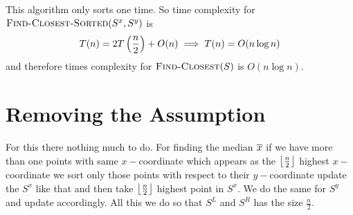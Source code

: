 This algorithm only sorts one time. So time complexity for $\textsc{Find-Closest-Sorted}(S^x,S^y)$ is $$T(n)=2T\left(\frac{n}{2}\right)+O(n)\implies T(n)=O(n\log n)$$and therefore times complexity for $\textsc{Find-Closest}(S)$ is $O(n\log n)$. 

\section{Removing the Assumption}
For this there nothing much to do. For finding the median $\overline{x}$ if we have more than one points with same $x-$coordinate which appears as the $\left\lfloor \frac{n}{2}\right\rfloor$ highest $x-$coordinate we sort only those points with respect to their $y-$coordinate update the $S^x$ like that and then take $\left\lfloor \frac{n}{2}\right\rfloor$ highest point in $S^x$. We do the same for $S^y$ and update accordingly. All this we do so that $S^L$ and $S^R$ has the size $\frac{n}{2}$. 
